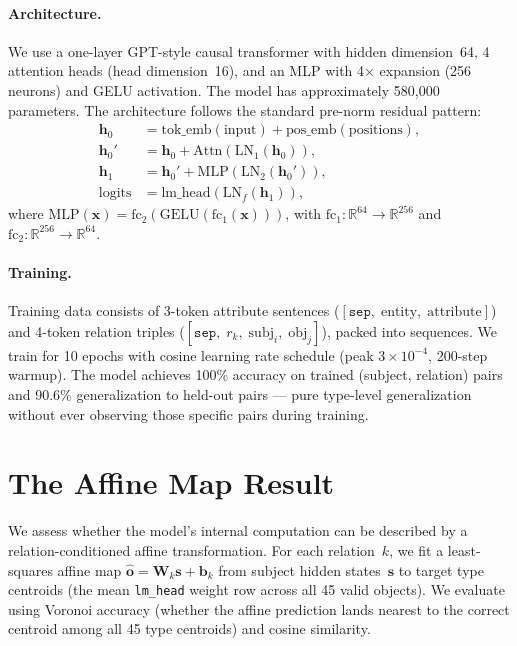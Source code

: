 \documentclass[11pt,a4paper]{article}
\newcommand{\R}{\mathbb{R}}
\newcommand{\bW}{\mathbf{W}}
\newcommand{\bb}{\mathbf{b}}
\newcommand{\bh}{\mathbf{h}}
\newcommand{\bx}{\mathbf{x}}
\newcommand{\bo}{\mathbf{o}}
\newcommand{\relu}{\mathrm{GELU}}
\newcommand{\lnorm}{\mathrm{LN}}
\newcommand{\fc}{\mathrm{fc}}
\begin{document}
\paragraph{Architecture.}
We use a one-layer GPT-style causal transformer with hidden
dimension~64, 4 attention heads (head dimension~16), and an MLP with
4$\times$ expansion (256 neurons) and GELU activation. The model has
approximately 580{,}000 parameters. The architecture follows the
standard pre-norm residual pattern:
\begin{align}
\bh_0 &= \mathrm{tok\_emb}(\text{input}) + \mathrm{pos\_emb}(\text{positions}), \label{eq:h0}\\
\bh_0' &= \bh_0 + \mathrm{Attn}(\lnorm_1(\bh_0)), \label{eq:attn}\\
\bh_1 &= \bh_0' + \mathrm{MLP}(\lnorm_2(\bh_0')), \label{eq:mlp}\\
\text{logits} &= \mathrm{lm\_head}(\lnorm_f(\bh_1)), \label{eq:logits}
\end{align}
where $\mathrm{MLP}(\bx) = \fc_2(\relu(\fc_1(\bx)))$, with
$\fc_1: \R^{64} \to \R^{256}$ and $\fc_2: \R^{256} \to \R^{64}$.

\paragraph{Training.}
Training data consists of 3-token attribute sentences
($[\texttt{sep},\;\text{entity},\;\text{attribute}]$) and 4-token
relation triples
($[\texttt{sep},\; r_k,\; \text{subj}_i,\; \text{obj}_j]$), packed
into sequences. We train for 10 epochs with cosine learning rate
schedule (peak $3 \times 10^{-4}$, 200-step warmup). The model
achieves 100\% accuracy on trained (subject, relation) pairs and
90.6\% generalization to held-out pairs --- pure type-level
generalization without ever observing those specific pairs during
training.

\section{The Affine Map Result}
\label{sec:affine}

We assess whether the model's internal computation can be described by
a relation-conditioned affine transformation. For each relation~$k$,
we fit a least-squares affine map $\hat{\bo} = \bW_k \mathbf{s} +
\bb_k$ from subject hidden states~$\mathbf{s}$ to target type
centroids (the mean \texttt{lm\_head} weight row across all 45 valid
objects). We evaluate using Voronoi accuracy (whether the affine
prediction lands nearest to the correct centroid among all 45 type
centroids) and cosine similarity.
\end{document}

